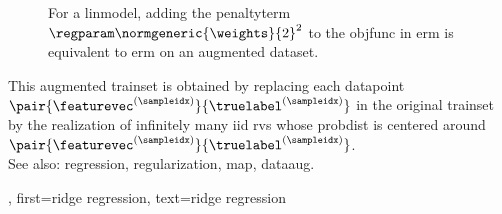{{\begin{figure}[H]
\begin{center}
			\caption{For a \gls{linmodel}, adding the \gls{penaltyterm} $\regparam \normgeneric{\weights}{2}^2$ to 
				the \gls{objfunc} in \gls{erm} is equivalent to \gls{erm} on an augmented \gls{dataset}.  \label{fig_ridge_regression_dict} }
			\end{center}
		\end{figure} 
		This augmented \gls{trainset} is obtained by replacing each \gls{datapoint} 
		$\pair{\featurevec^{(\sampleidx)}}{\truelabel^{(\sampleidx)}}$ 
		in the original \gls{trainset} by the \gls{realization} of infinitely 
		many \gls{iid} \glspl{rv} whose \gls{probdist} is centered around 
		$\pair{\featurevec^{(\sampleidx)}}{\truelabel^{(\sampleidx)}}$.
	    		\\
		See also: \gls{regression}, \gls{regularization}, \gls{map}, \gls{dataaug}.},
	first={ridge regression},
	text={ridge regression}
}

